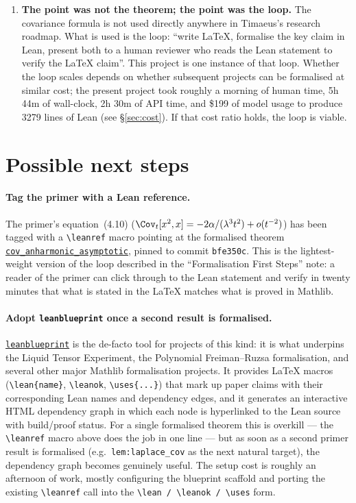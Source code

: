 \documentclass[11pt]{article}
\begin{document}
\begin{enumerate}
\item \textbf{The point was not the theorem; the point was the loop.}
The covariance formula is not used directly anywhere in Timaeus's
research roadmap. What is used is the loop: ``write LaTeX, formalise the
key claim in Lean, present both to a human reviewer who reads the Lean
statement to verify the LaTeX claim''. This project is one instance of
that loop. Whether the loop scales depends on whether subsequent
projects can be formalised at similar cost; the present project took
roughly a morning of human time, 5h 44m of wall-clock, 2h 30m of API
time, and \$199 of model usage to produce 3279 lines of Lean (see
\S\ref{sec:cost}). If that cost ratio holds, the loop is viable.
\end{enumerate}

\section{Possible next steps}

\paragraph{Tag the primer with a Lean reference.} The primer's
equation~(4.10) ($\Cov_t[x^2,x] = -2\alpha/(\lambda^3 t^2) + o(t^{-2})$)
has been tagged with a \texttt{\textbackslash leanref} macro pointing at
the formalised theorem
\href{https://github.com/timaeus-research/laplace/blob/bfe350c/Laplace/OneD/IntegralRemainder.lean\#L1454}{\texttt{cov\_anharmonic\_asymptotic}},
pinned to commit \texttt{bfe350c}. This is the lightest-weight version
of the loop described in the ``Formalisation First Steps'' note: a
reader of the primer can click through to the Lean statement and verify
in twenty minutes that what is stated in the LaTeX matches what is
proved in Mathlib.

\paragraph{Adopt \texttt{leanblueprint} once a second result is
formalised.} \href{https://github.com/PatrickMassot/leanblueprint}{\texttt{leanblueprint}}
is the de-facto tool for projects of this kind: it is what underpins the
Liquid Tensor Experiment, the Polynomial Freiman--Ruzsa formalisation,
and several other major Mathlib formalisation projects. It provides
LaTeX macros (\texttt{\textbackslash lean\{name\}},
\texttt{\textbackslash leanok}, \texttt{\textbackslash uses\{...\}}) that
mark up paper claims with their corresponding Lean names and dependency
edges, and it generates an interactive HTML dependency graph in which
each node is hyperlinked to the Lean source with build/proof status.
For a single formalised theorem this is overkill --- the
\texttt{\textbackslash leanref} macro above does the job in one line ---
but as soon as a second primer result is formalised (e.g.\
\texttt{lem:laplace\_cov} as the next natural target), the dependency
graph becomes genuinely useful. The setup cost is roughly an afternoon
of work, mostly configuring the blueprint scaffold and porting the
existing \texttt{\textbackslash leanref} call into the
\texttt{\textbackslash lean / \textbackslash leanok / \textbackslash uses}
form.
\end{document}
